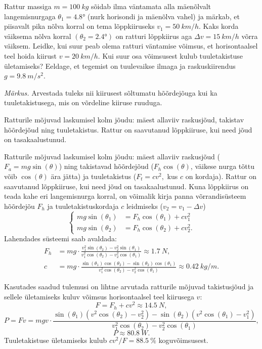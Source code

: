 
Rattur massiga $m=\SI{100}{kg}$ sõidab ilma väntamata alla mäenõlvalt langemisnurgaga
$\theta_{1}=\ang{4.8}$ (nurk horisondi ja mäenõlva vahel)
ja märkab, et piisavalt pika nõlva korral on tema lõppkiiruseks $v_{1}=\SI{50}{km/h}$.
Kaks korda väiksema nõlva korral $(\theta_{2}=\ang{2.4})$
on ratturi lõppkiirus aga $\Delta v=\SI{15}{km/h}$ võrra väiksem.
Leidke, kui suur peab olema ratturi väntamise võimsus, et horisontaalsel
teel hoida kiirust $v=\SI{20}{km/h}.$ Kui suur osa võimsusest kulub
tuuletakistuse ületamiseks? Eeldage, et tegemist on tuulevaikse ilmaga
ja raskuskiirendus $g=\SI{9.8}{m/s^{2}}$. 

\emph{Märkus.} Arvestada tuleks nii kiirusest sõltumatu hõõrdejõuga kui ka tuuletakistusega,
mis on võrdeline kiiruse ruuduga.

\hint
Ratturile mõjuvad laskumisel kolm jõudu: mäest allaviiv raskusjõud, takistav hõõrdejõud ning tuuletakistus. Rattur on saavutanud lõppkiiruse, kui need jõud on tasakaalustunud.

\solu
Ratturile mõjuvad laskumisel kolm jõudu: mäest allaviiv raskusjõud
($F_{a}=mg\sin(\theta)$) ning takistavad hõõrdejõud ($F_{h}\cos(\theta)$, väikese nurga tõttu võib $\cos(\theta)$ ära jätta)
ja tuuletakistus ($F_{t}=cv^{2},$ kus $c$ on kordaja). Rattur on
saavutanud lõppkiiruse, kui need jõud on tasakaalustunud. Kuna lõppkiirus
on teada kahe eri langemisnurga korral, on võimalik kirja panna võrrandisüsteem
hõõrdejõu $F_{h}$ ja tuuletakistuskordaja $c$ leidmiseks ($v_{2}=v_{1}-\Delta v$) 
\[
\begin{cases}
mg\sin(\theta_{1})&=F_{h}\cos(\theta_1)+cv_{1}^{2}\\
mg\sin(\theta_{2})&=F_{h}\cos(\theta_2)+cv_{2}^{2}.
\end{cases}
\]
Lahendades süsteemi saab avaldada:
\begin{align*}
F_{h} & = mg\cdot\frac{v_{1}^{2}\sin(\theta_{2})-v_{2}^{2}\sin(\theta_{1})}{v_{1}^{2}\cos(\theta_2)-v_{2}^{2}\cos(\theta_1)}\approx\SI{1.7}{N},\\[7pt] 
c & = mg\cdot\frac{\sin(\theta_{1})\cos(\theta_2)-\sin(\theta_{2})\cos(\theta_1)}{v_{1}^{2}\cos(\theta_2)-v_{2}^{2}\cos(\theta_1)}\approx\SI{0.42}{kg/m}.
\end{align*}

Kasutades saadud tulemusi on lihtne arvutada ratturile mõjuvad
takistusjõud ja sellele ületamiseks kuluv võimsus horisontaalsel teel
kiirusega $v$:
\[
F=F_{h}+cv^{2}\approx\SI{14.5}{N},
\]
\[
P=Fv=mgv\cdot\frac{\sin(\theta_{1})\left(v^{2}\cos(\theta_2)-v_{2}^{2}\right)-\sin(\theta_{2})\left(v^{2}\cos(\theta_1)-v_{1}^{2}\right)}{v_{1}^{2}\cos(\theta_2)-v_{2}^{2}\cos(\theta_1)},
\]
\[
P\approx\SI{80.8}{W}.
\]
Tuuletakistuse ületamiseks kulub $cv^{2}/F=\SI{88.5}{\percent}$
koguvõimsusest.

